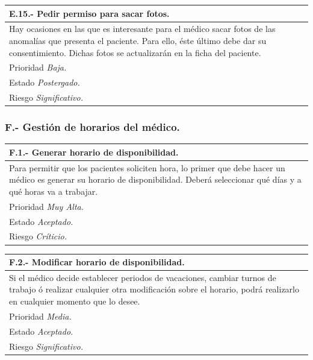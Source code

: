 \documentclass[a4paper,oneside,11pt]{book}
\begin{document}
\begin{center}
\begin{tabulary}{15cm}{|L|}
	\hline
		\bf{E.15.- Pedir permiso para sacar fotos.} \\
	\hline
		Hay ocasiones en las que es interesante para el médico sacar fotos de las anomalías que presenta el paciente. Para ello, éste último debe dar su consentimiento. Dichas fotos se actualizarán en la ficha del paciente. \\
	\hline
		Prioridad \textit{Baja.} \\
	\hline
		Estado \textit{Postergado.} \\
	\hline
		Riesgo \textit{Significativo.} \\
	\hline
\end{tabulary}
\end{center}


\subsubsection{F.- Gestión de horarios del médico.}

\begin{center}
\begin{tabulary}{15cm}{|L|}
	\hline
		\bf{F.1.- Generar horario de disponibilidad.} \\
	\hline
		Para permitir que los pacientes soliciten hora, lo primer que debe hacer un médico es generar su horario de disponibilidad. Deberá seleccionar qué días y a qué horas va a trabajar. \\
	\hline
		Prioridad \textit{Muy Alta.} \\
	\hline
		Estado \textit{Aceptado.} \\
	\hline
		Riesgo \textit{Críticio.} \\
	\hline
\end{tabulary}
\end{center}

\begin{center}
\begin{tabulary}{15cm}{|L|}
	\hline
		\bf{F.2.- Modificar horario de disponibilidad.} \\
	\hline
		Si el médico decide establecer periodos de vacaciones, cambiar turnos de trabajo ó realizar cualquier otra modificación sobre el horario, podrá realizarlo en cualquier momento que lo desee. \\
	\hline
		Prioridad \textit{Media.} \\
	\hline
		Estado \textit{Aceptado.} \\
	\hline
		Riesgo \textit{Significativo.} \\
	\hline
\end{tabulary}
\end{center}
\end{document}
